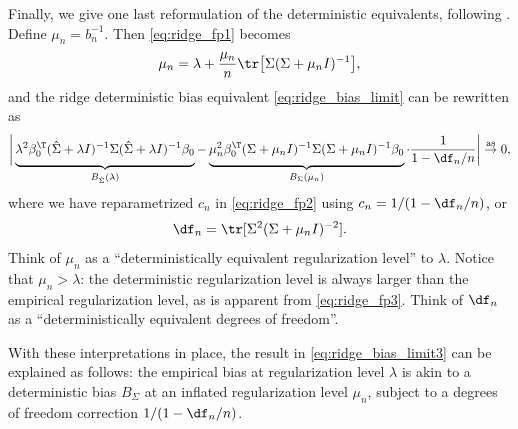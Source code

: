 \documentclass{article}
\begin{document}
Finally, we give one last reformulation of the deterministic equivalents,
following \citet{lejeune2022asymptotics, bach2023high}. Define $\mu_n =
b_n^{-1}$. Then \eqref{eq:ridge_fp1} becomes 
\begin{equation}
\label{eq:ridge_fp3}
\mu_n = \lambda + \frac{\mu_n}{n} \tr \big[ \Sigma (\Sigma + \mu_n I)^{-1}
\big], 
\end{equation}
and the ridge deterministic bias equivalent \eqref{eq:ridge_bias_limit} can be
rewritten as
\begin{equation}
\label{eq:ridge_bias_limit3}
\bigg| \underbrace{ \lambda^2 \beta_0^\T (\hSigma + \lambda I)^{-1} \Sigma  
  (\hSigma + \lambda I)^{-1} \beta_0 \vphantom{ \Big] } }_{B_{\hSigma}(\lambda)}
- \underbrace{ \mu_n^2 \beta_0^\T(\Sigma + \mu_n I)^{-1} \Sigma (\Sigma + \mu_n
  I)^{-1} \beta_0 \vphantom{ \Big] }}_{B_\Sigma(\mu_n)} \cdot \frac{1}{1 - \df_n
  / n} \bigg| \asto 0,      
\end{equation}
where we have reparametrized $c_n$ in \eqref{eq:ridge_fp2} using $c_n = 1 / (1 -
\df_n / n)$, or 
\begin{equation}
\label{eq:ridge_fp4}
\df_n = \tr [ \Sigma^2 (\Sigma + \mu_n I)^{-2} ].
\end{equation}
Think of $\mu_n$ as a ``deterministically equivalent regularization level'' to
$\lambda$. Notice that $\mu_n > \lambda$: the deterministic regularization level
is always larger than the empirical regularization level, as is apparent from
\eqref{eq:ridge_fp3}. Think of $\df_n$ as a ``deterministically equivalent
degrees of freedom''.  

With these interpretations in place, the result in \eqref{eq:ridge_bias_limit3}
can be explained as follows: the empirical bias  at
regularization level $\lambda$ is akin to a deterministic bias $B_\Sigma$ at an
inflated regularization level $\mu_n$, subject to a degrees of freedom
correction $1 / (1 - \df_n / n)$.  



\end{document}
